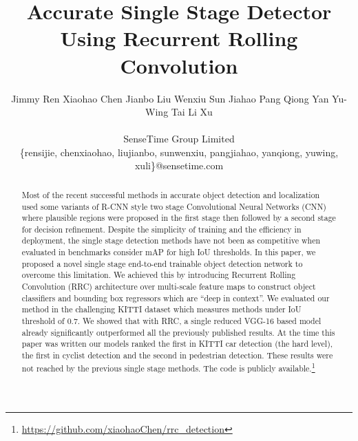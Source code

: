 \documentclass[10pt,twocolumn,letterpaper]{article}
\begin{document}
\title{Accurate Single Stage Detector Using Recurrent Rolling Convolution}
\author{
Jimmy Ren \hspace{0.03in} Xiaohao Chen \hspace{0.03in} Jianbo Liu \hspace{0.03in} Wenxiu Sun \hspace{0.03in} Jiahao Pang \hspace{0.03in} Qiong Yan \hspace{0.03in} Yu-Wing Tai \hspace{0.03in} Li Xu\\\\
SenseTime Group Limited\\
\{rensijie, chenxiaohao, liujianbo, sunwenxiu, pangjiahao, yanqiong, yuwing, xuli\}@sensetime.com\\
}

\maketitle
\thispagestyle{empty}

\begin{abstract}
Most of the recent successful methods in accurate object detection and localization used some variants of R-CNN style two stage Convolutional Neural Networks (CNN) where plausible regions were proposed in the first stage then followed by a second stage for decision refinement. Despite the simplicity of training and the efficiency in deployment, the single stage detection methods have not been as competitive when evaluated in benchmarks consider mAP for high IoU thresholds. In this paper, we proposed a novel single stage end-to-end trainable object detection network to overcome this limitation. We achieved this by introducing Recurrent Rolling Convolution (RRC) architecture over multi-scale feature maps to construct object classifiers and bounding box regressors which are ``deep in context''. We evaluated our method in the challenging KITTI dataset which measures methods under IoU threshold of 0.7. We showed that with RRC, a single reduced VGG-16 based model already significantly outperformed all the previously published results. At the time this paper was written our models ranked the first in KITTI car detection (the hard level), the first in cyclist detection and the second in pedestrian detection. These results were not reached by the previous single stage methods. The code is publicly available.\footnote{\url{https://github.com/xiaohaoChen/rrc_detection}}
\end{abstract}
\end{document}
